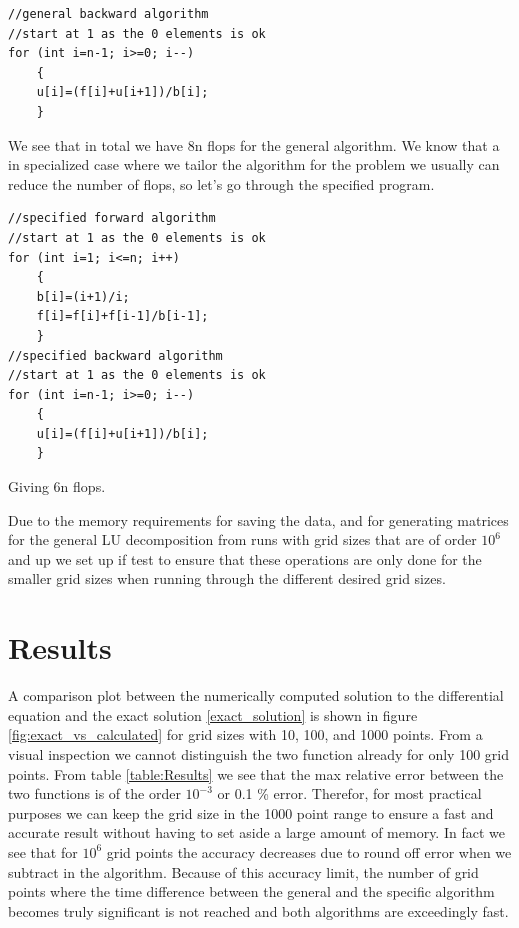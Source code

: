 \documentclass[a4paper,11pt]{article}
\begin{document}
{\begin{lstlisting}
//general backward algorithm
//start at 1 as the 0 elements is ok
for (int i=n-1; i>=0; i--)
	{
	u[i]=(f[i]+u[i+1])/b[i];
	}
\end{lstlisting}
		
We see that in total we have 8n flops for the general algorithm. We know that a in specialized case where we tailor the algorithm for the problem we usually can reduce the number of flops, so let's go through the specified program. 
		
\begin{lstlisting}
//specified forward algorithm
//start at 1 as the 0 elements is ok
for (int i=1; i<=n; i++)
	{
	b[i]=(i+1)/i;
	f[i]=f[i]+f[i-1]/b[i-1];
	}
//specified backward algorithm
//start at 1 as the 0 elements is ok
for (int i=n-1; i>=0; i--)
	{
	u[i]=(f[i]+u[i+1])/b[i];
	}
\end{lstlisting}
		
Giving 6n flops.

Due to the memory requirements for saving the data, and for generating matrices for the general LU decomposition from runs with grid sizes that are of order $10^{6}$ and up we set up if test to ensure that these operations are only done for the smaller grid sizes when running through the different desired grid sizes.
		
		

\section*{Results}

A comparison plot between the numerically computed solution to the differential equation and the exact solution \ref{exact_solution} is shown in figure \ref{fig:exact_vs_calculated} for grid sizes with 10, 100, and 1000 points. From a visual inspection we cannot distinguish the two function already for only 100 grid points. From table \ref*{table:Results} we see that the max relative error between the two functions is of the order $10^{-3}$ or 0.1 \% error. Therefor, for most practical purposes we can keep the grid size in the 1000 point range to ensure a fast and accurate result without having to set aside a large amount of memory. In fact we see that for $10^{6}$ grid points the accuracy decreases due to round off error when we subtract in the algorithm. Because of this accuracy limit, the number of grid points where the time difference between the general and the specific algorithm becomes truly significant is not reached and both algorithms are exceedingly fast.


}
\end{document}
